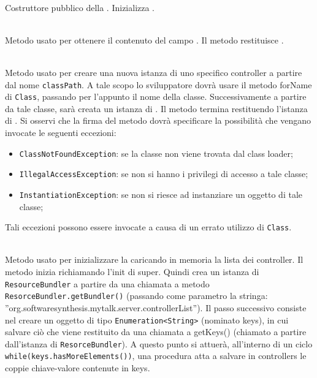 \begin{description}
	\item{}\\
	Costruttore pubblico della . Inizializza .
	
	\item{}\\
	Metodo usato per ottenere il contenuto del campo . Il metodo restituisce .
	
	\item{}\\
	Metodo usato per creare una nuova istanza di uno specifico controller a partire dal nome \texttt{classPath}. A tale scopo lo sviluppatore dovrà usare il metodo forName di \texttt{Class}, passando per l'appunto il nome della classe. Successivamente a partire da tale classe, sarà creata un istanza di . Il metodo termina restituendo l'istanza di . Si osservi che la firma del metodo dovrà specificare la possibilità che vengano invocate le seguenti eccezioni:
	\begin{itemize}
		\item \texttt{ClassNotFoundException}: se la classe non viene trovata dal class loader;
		\item \texttt{IllegalAccessException}: se non si hanno i privilegi di accesso a tale classe;
		\item \texttt{InstantiationException}: se non si riesce ad instanziare un oggetto di tale classe;
	\end{itemize}
	
	Tali eccezioni possono essere invocate a causa di un errato utilizzo di \texttt{Class}.
	
	\item{}\\
	Metodo usato per inizializzare la  caricando in memoria la lista dei controller. Il metodo inizia richiamando l'init di super. Quindi crea un istanza di \texttt{ResourceBundler} a partire da una chiamata a metodo \texttt{ResorceBundler.getBundler()} (passando come parametro la stringa: ''org.softwaresynthesis.mytalk.server.controllerList''). Il passo successivo consiste nel creare un oggetto di tipo \texttt{Enumeration<String>} (nominato keys), in cui salvare ciò che viene restituito da una chiamata a getKeys() (chiamato a partire dall'istanza di \texttt{ResorceBundler}). A questo punto si attuerà, all'interno di un ciclo \verb|while(keys.hasMoreElements())|, una procedura atta a salvare in controllers le coppie chiave-valore contenute in keys.
	

\end{description}
